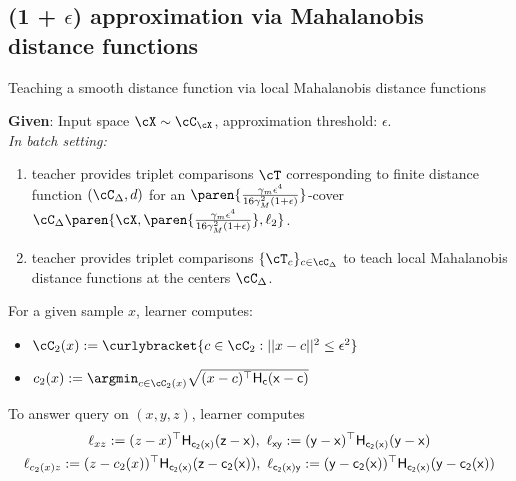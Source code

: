 
\subsection{(1 + $\epsilon$) approximation via Mahalanobis distance functions}

\begin{algorithm}[t]
\caption{Teaching a smooth distance function via local Mahalanobis distance functions}
\label{alg: smoothdistl2}
\textbf{Given}: Input space $\cX \sim \cC_{\cX}$, approximation threshold: $\epsilon$.\\
\vspace{1mm}
\textit{In batch setting:}\vspace{1mm}
\begin{enumerate}
    \item teacher provides triplet comparisons $\cT$ corresponding to finite distance function $(\cC_\Delta, d)$ for an $\paren{\frac{\gamma_m \epsilon^4}{16\gamma_M^2 (1 + \epsilon)}}$-cover $\cC_\Delta\paren{\cX,\paren{\frac{\gamma_m \epsilon^4}{16\gamma_M^2 (1 + \epsilon)}},\ell_2}$.
    \item teacher provides triplet comparisons $\{\cT_c\}_{c \in \cC_\Delta}$ to teach local Mahalanobis distance functions at the centers $\cC_\Delta$.
\end{enumerate}
For a given sample $x$, learner computes:
\begin{itemize}
    \item $\cC_2(x) := \curlybracket{c \in \cC_2: ||x - c ||^2 \le \epsilon^2}$ 
    \item $c_2(x) := \argmin_{c \in \cC_2(x)} \sqrt{(x-c)^{\top}\sf{H}_c(x-c)}$
\end{itemize}
\vspace{1mm}
To answer query on $(x,y,z)$, learner computes 
\begin{gather*}
  \ell_{xz} := (z - x)^{\top}\sf{H}_{c_2(x)}(z - x),\,\, \ell_{xy} := (y - x)^{\top}\sf{H}_{c_2(x)}(y - x)  \\
  \ell_{c_2(x)z} := (z - c_2(x))^{\top}\sf{H}_{c_2(x)}(z - c_2(x)),\,\, \ell_{c_2(x)y} := (y - c_2(x))^{\top}\sf{H}_{c_2(x)}(y - c_2(x))    

\end{gather*}
\end{algorithm}
